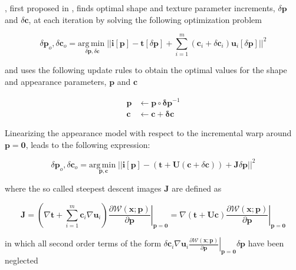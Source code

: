 , first proposed in \cite{}, finds optimal shape and texture parameter increments, $\delta \mathbf{p}$ and
$\delta \mathbf{c}$, at each iteration by solving the following optimization problem

\begin{equation}
\delta \mathbf{p}_o, \delta \mathbf{c}_o = \underset{\delta \mathbf{p}, \delta \mathbf{c}}{\mathrm{arg\,min\;}} 
|| \mathbf{i} [\mathbf{p}] - \mathbf{t}[\delta \mathbf{p}] + \sum_{i=1}^m (\mathbf{c}_i + \delta \mathbf{c}_i) \mathbf{u}_i[\delta \mathbf{p}] ||^2 
\end{equation}

and uses the following update rules to obtain the optimal values for the shape and appearance parameters, $\mathbf{p}$ and $\mathbf{c}$

\begin{align}
\mathbf{p} & \leftarrow \mathbf{p} \circ \mathbf{\delta \mathbf{p}}^{-1} \\
\mathbf{c} & \leftarrow \mathbf{c} + \mathbf{\delta \mathbf{c}}
\end{align}

Linearizing the appearance model with respect to the incremental warp around $\mathbf{p} = \mathbf{0}$, leads to the following expression:

\begin{equation}
\delta \mathbf{p}_o, \delta \mathbf{c}_o = \underset{\mathbf{p}, \mathbf{c}}{\mathrm{arg\,min\;}} 
|| \mathbf{i} [\mathbf{p}] - (\mathbf{t} + \mathbf{U} (\mathbf{c} + \delta \mathbf{c})) + \mathbf{J} \delta \mathbf{p} ||^2
\label{eq:sim_linear}
\end{equation}

where the so called steepest descent images $\mathbf{J}$ are defined as

\begin{equation}
\mathbf{J} = 
\left( \nabla \mathbf{t} + \sum_{i=1}^m \mathbf{c}_i \nabla \mathbf{u}_i \right) \left. \frac{\partial \mathcal{W}(\mathbf{x}; \mathbf{p})}{\partial \mathbf{p}} \right|_{\mathbf{p}=\mathbf{0}} =
\nabla (\mathbf{t} + \mathbf{U} \mathbf{c}) \left. \frac{\partial \mathcal{W}(\mathbf{x}; \mathbf{p})}{\partial \mathbf{p}} \right|_{\mathbf{p}=\mathbf{0}}
\end{equation}

in which all second order terms of the form $\delta \mathbf{c}_i \nabla \mathbf{u}_i \left. \frac{\partial \mathcal{W}(\mathbf{x}; \mathbf{p})}{\partial \mathbf{p}} \right|_{\mathbf{p}=\mathbf{0}} \delta \mathbf{p}$ have been neglected

